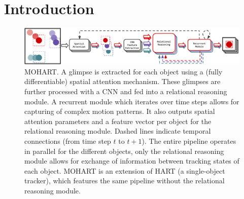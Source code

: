 \section{Introduction}
\label{sec:mohart_intro}




\begin{figure}[b!]
	   \vspace{-2mm}
	\centering
		\includegraphics[width=\linewidth]{figures/MOHART/mohart_stacked.pdf}
	\vspace{-4mm}
	\caption{
		\Gls{MOHART}. A glimpse is extracted for each object using a (fully differentiable) spatial attention mechanism. These glimpses are further processed with a CNN and fed into a relational reasoning module. A recurrent module which iterates over time steps allows for capturing of complex motion patterns. It also outputs spatial attention parameters and a feature vector per object for the relational reasoning module. Dashed lines indicate temporal connections (from time step $t$ to $t+1$). The entire pipeline operates in parallel for the different objects, only the relational reasoning module allows for exchange of information between tracking states of each object. \gls{MOHART} is an extension of \acrshort{HART} (a single-object tracker), which features the same pipeline without the relational reasoning module.
	}
	\label{fig:teaser}
\end{figure}


